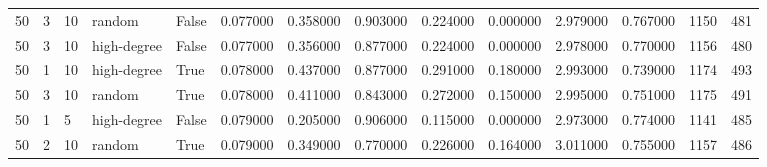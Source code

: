 \begin{table}
\begin{tabular}{llllllllllllll}
50 & 3 & 10 & random & False & 0.077000 & 0.358000 & 0.903000 & 0.224000 & 0.000000 & 2.979000 & 0.767000 & 1150 & 481 \\
50 & 3 & 10 & high-degree & False & 0.077000 & 0.356000 & 0.877000 & 0.224000 & 0.000000 & 2.978000 & 0.770000 & 1156 & 480 \\
50 & 1 & 10 & high-degree & True & 0.078000 & 0.437000 & 0.877000 & 0.291000 & 0.180000 & 2.993000 & 0.739000 & 1174 & 493 \\
50 & 3 & 10 & random & True & 0.078000 & 0.411000 & 0.843000 & 0.272000 & 0.150000 & 2.995000 & 0.751000 & 1175 & 491 \\
50 & 1 & 5 & high-degree & False & 0.079000 & 0.205000 & 0.906000 & 0.115000 & 0.000000 & 2.973000 & 0.774000 & 1141 & 485 \\
50 & 2 & 10 & random & True & 0.079000 & 0.349000 & 0.770000 & 0.226000 & 0.164000 & 3.011000 & 0.755000 & 1157 & 486 \\
\bottomrule
\end{tabular}
\end{table}
